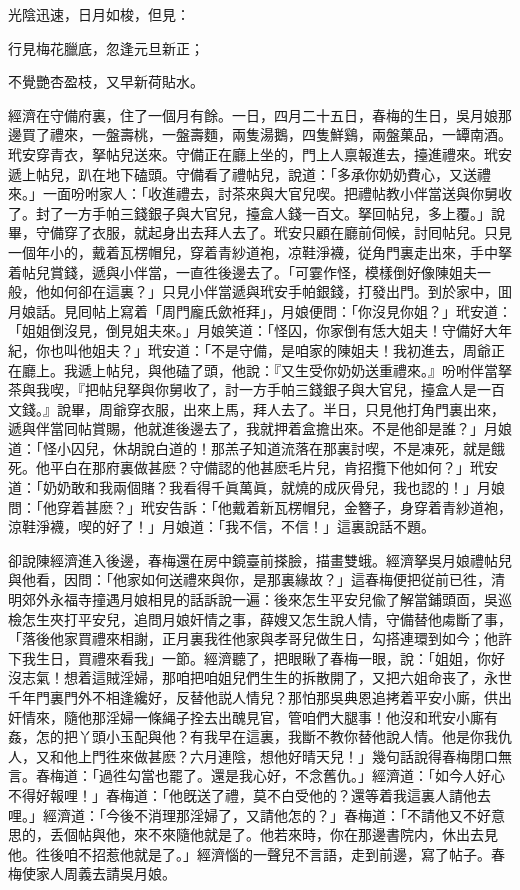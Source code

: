光陰迅速，日月如梭，但見：

\begin{myquote}
行見梅花臘底，忽逢元旦新正；

不覺艷杏盈枝，又早新荷貼水。
\end{myquote}

經濟在守備府裏，住了一個月有餘。一日，四月二十五日，春梅的生日，吳月娘那邊買了禮來，一盤壽桃，一盤壽麵，兩隻湯鵝，四隻鮮鷄，兩盤菓品，一罈南酒。玳安穿青衣，拏帖兒送來。守備正在廳上坐的，門上人禀報進去，擡進禮來。玳安遞上帖兒，趴在地下磕頭。守備看了禮帖兒，說道：「多承你奶奶費心，又送禮來。」一面吩咐家人：「收進禮去，討茶來與大官兒喫。把禮帖教小伴當送與你舅收了。封了一方手帕三錢銀子與大官兒，擡盒人錢一百文。拏回帖兒，多上覆。」說畢，守備穿了衣服，就起身出去拜人去了。玳安只顧在廳前伺候，討囘帖兒。只見一個年小的，戴着瓦楞帽兒，穿着青紗道袍，凉鞋淨襪，従角門裏走出來，手中拏着帖兒賞錢，遞與小伴當，一直徃後邊去了。「可霎作怪，模樣倒好像陳姐夫一般，他如何卻在這裏？」只見小伴當遞與玳安手帕銀錢，打發出門。到於家中，囬月娘話。見囘帖上寫着「周門龐氏歛袵拜」，月娘便問：「你沒見你姐？」玳安道：「姐姐倒沒見，倒見姐夫來。」月娘笑道：「怪囚，你家倒有恁大姐夫！守備好大年紀，你也叫他姐夫？」玳安道：「不是守備，是咱家的陳姐夫！我初進去，周爺正在廳上。我遞上帖兒，與他磕了頭，他說：『又生受你奶奶送重禮來。』吩咐伴當拏茶與我喫，『把帖兒拏與你舅收了，討一方手帕三錢銀子與大官兒，擡盒人是一百文錢。』說畢，周爺穿衣服，出來上馬，拜人去了。半日，只見他打角門裏出來，遞與伴當囘帖賞賜，他就進後邊去了，我就押着盒擔出來。不是他卻是誰？」月娘道：「怪小囚兒，休胡說白道的！那羔子知道流落在那裏討喫，不是凍死，就是餓死。他平白在那府裏做甚麽？守備認的他甚麽毛片兒，肯招攬下他如何？」玳安道：「奶奶敢和我兩個賭？我看得千眞萬眞，就燒的成灰骨兒，我也認的！」月娘問：「他穿着甚麽？」玳安告訴：「他戴着新瓦楞帽兒，金簪子，身穿着青紗道袍，涼鞋淨襪，喫的好了！」月娘道：「我不信，不信！」這裏說話不題。

卻說陳經濟進入後邊，春梅還在房中鏡臺前搽臉，描畫雙蛾。經濟拏吳月娘禮帖兒與他看，因問：「他家如何送禮來與你，是那裏緣故？」這春梅便把従前已徃，清明郊外永福寺撞遇月娘相見的話訴說一遍：後來怎生平安兒偸了解當鋪頭靣，吳巡檢怎生夾打平安兒，追問月娘奸情之事，薛嫂又怎生說人情，守備替他䖏斷了事，「落後他家買禮來相謝，正月裏我徃他家與孝哥兒做生日，勾搭連環到如今；他許下我生日，買禮來看我」一節。經濟聽了，把眼瞅了春梅一眼，說：「姐姐，你好沒志氣！想着這賊淫婦，那咱把咱姐兒們生生的拆散開了，又把六姐命丧了，永世千年門裏門外不相逢纔好，反替他説人情兒？那怕那吳典恩追拷着平安小廝，供出奸情來，隨他那淫婦一條䋲子拴去出醜見官，管咱們大腿事！他沒和玳安小廝有姦，怎的把丫頭小玉配與他？有我早在這裏，我斷不教你替他說人情。他是你我仇人，又和他上門徃來做甚麽？六月連陰，想他好晴天兒！」幾句話說得春梅閉口無言。春梅道：「過徃勾當也罷了。還是我心好，不念舊仇。」經濟道：「如今人好心不得好報哩！」春梅道：「他旣送了禮，莫不白受他的？還等着我這裏人請他去哩。」經濟道：「今後不消理那淫婦了，又請他怎的？」春梅道：「不請他又不好意思的，丢個帖與他，來不來隨他就是了。他若來時，你在那邊書院内，休出去見他。徃後咱不招惹他就是了。」經濟惱的一聲兒不言語，走到前邊，寫了帖子。春梅使家人周義去請吳月娘。

